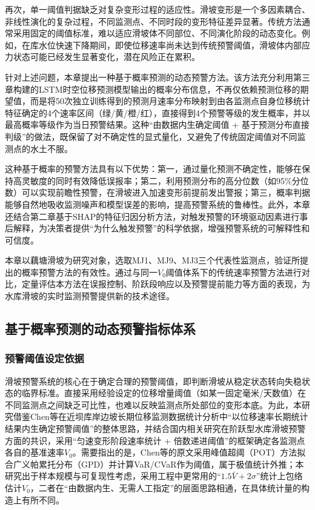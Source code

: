 \documentclass[12pt,a4paper]{article}
\begin{document}
再次，单一阈值判据缺乏对复杂变形过程的适应性。滑坡变形是一个多因素耦合、非线性演化的复杂过程，不同监测点、不同时段的变形特征差异显著。传统方法通常采用固定的阈值标准，难以适应滑坡体不同部位、不同演化阶段的动态变化。例如，在库水位快速下降期间，即使位移速率尚未达到传统预警阈值，滑坡体内部应力状态可能已经发生显著变化，潜在风险正在累积。

针对上述问题，本章提出一种基于概率预测的动态预警方法。该方法充分利用第三章构建的LSTM时空位移预测模型输出的概率分布信息，不再仅依赖预测位移的期望值，而是将50次独立训练得到的预测月速率分布映射到由各监测点自身位移统计特征确定的4个速率区间（绿/黄/橙/红），直接得到4个预警等级的发生概率，并以最高概率等级作为当日预警结果。这种“由数据内生确定阈值 + 基于预测分布直接判级”的做法，既保留了对不确定性的显式量化，又避免了传统固定阈值对不同监测点的水土不服。

这种基于概率的预警方法具有以下优势：第一，通过量化预测不确定性，能够在保持高灵敏度的同时有效降低误报率；第二，利用预测分布的高分位数（如95\%分位数）可以实现前瞻性预警，在滑坡进入加速变形前提前发出警报；第三，概率判据能够自然地吸收监测噪声和模型误差的影响，提高预警系统的鲁棒性。此外，本章还结合第二章基于SHAP的特征归因分析方法，对触发预警的环境驱动因素进行事后解释，为决策者提供“为什么触发预警”的科学依据，增强预警系统的可解释性和可信度。

本章以藕塘滑坡为研究对象，选取MJ1、MJ9、MJ3三个代表性监测点，验证所提出的概率预警方法的有效性。通过与同一$V_0$阈值体系下的传统速率预警方法进行对比，定量评估本方法在误报控制、阶跃段响应以及预警提前能力等方面的表现，为水库滑坡的实时监测预警提供新的技术途径。
\subsection{基于概率预测的动态预警指标体系}

\subsubsection{预警阈值设定依据}

滑坡预警系统的核心在于确定合理的预警阈值，即判断滑坡从稳定状态转向失稳状态的临界标准。直接采用经验设定的位移增量阈值（如某一固定毫米/天数值）在不同监测点之间缺乏可比性，也难以反映监测点所处部位的变形本底。为此，本研究借鉴Chen等\cite{chen2024statistical}在近坝库岸边坡长期位移监测数据统计分析中“以位移速率长期统计结果内生确定预警阈值”的整体思路，并结合国内相关研究\cite{tang2025pso,meng2024time}在阶跃型水库滑坡预警方面的共识，采用“匀速变形阶段速率统计 + 倍数递进阈值”的框架确定各监测点各自的基准速率$V_0$。需要指出的是，Chen等\cite{chen2024statistical}的原文采用峰值超阈（POT）方法拟合广义帕累托分布（GPD）并计算VaR/CVaR作为阈值，属于极值统计外推；本研究出于样本规模与可复现性考虑，采用工程中更常用的“$1.5\bar V + 2\sigma$”统计上包络估计$V_0$，二者在“由数据内生、无需人工指定”的层面思路相通，在具体统计量的构造上有所不同。
\end{document}
